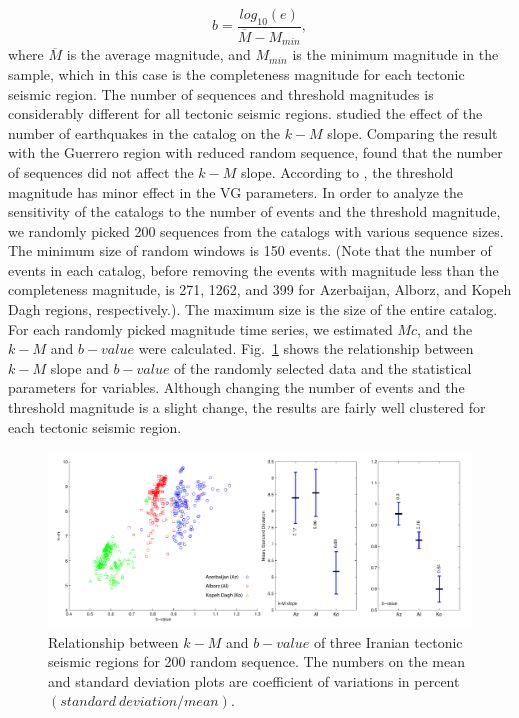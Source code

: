 \begin{equation}
b = \frac{log_{10}(e) }{\overline{M} - M_{min}},
\end{equation}
 \noindent
where $\overline{M}$ is the average magnitude, and  $M_ {min}$ is the minimum magnitude in the sample, which in this case is the completeness magnitude for each tectonic seismic region. The number of sequences and threshold magnitudes is considerably different for all tectonic seismic regions.  \citet{Telesca2013}  studied the effect of the number of earthquakes in the catalog on the  $k-M$  slope. Comparing the result with the Guerrero region with reduced random sequence,  \citet{Telesca2013}  found that the number of sequences did not affect the  $k-M$  slope.  According to  \citet{Telesca2012}, the threshold magnitude has minor effect in the VG parameters. In order to analyze the sensitivity of the catalogs to the number of events and the threshold magnitude, we randomly picked 200 sequences from the catalogs with various sequence sizes. The minimum size of random windows is 150 events. (Note that the number of events in each catalog, before removing the events with magnitude less than the completeness magnitude, is 271, 1262, and 399 for Azerbaijan, Alborz, and Kopeh Dagh regions, respectively.). The maximum size is the size of the entire catalog. For each randomly picked magnitude time series,  we estimated $Mc$,  and the  $k-M$  and $b-value$ were calculated. Fig.~\ref{fig:random} shows the relationship between  $k-M$  slope and  $b-value$  of the randomly selected data and the statistical parameters for variables. Although changing the number of events and the threshold magnitude is a slight change, the results are fairly well clustered for each tectonic seismic region. 
   
 \begin{figure} [ht]
\centering
\includegraphics[scale=0.4]{figures/pdf/Figure06.pdf} 
\caption{ Relationship between $k-M$ and $b-value$ of three Iranian tectonic seismic regions for 200 random sequence. The numbers on the mean and standard deviation plots are coefficient of variations in percent$(standard \ deviation / mean)$.}
\label{fig:random}
\end{figure}

